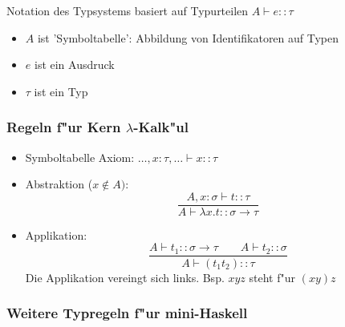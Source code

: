 \documentclass[german,10pt, a4paper, twocolumn]{scrartcl}
\theoremstyle{definition}
\theoremstyle{remark}
\begin{document}
Notation des Typsystems basiert auf Typurteilen $A \vdash e :: \tau$
\begin{itemize}
	\item $A$ ist 'Symboltabelle': Abbildung von Identifikatoren auf Typen
	\item $e$ ist ein Ausdruck
	\item $\tau$ ist ein Typ
\end{itemize}

\subsubsection{Regeln f"ur Kern $\lambda$-Kalk"ul}

\begin{itemize}
	\item Symboltabelle Axiom: $\ldots,x:\tau,\ldots\vdash x ::\tau$
	\item Abstraktion ($x \not\in A)$:
		\begin{displaymath}
			\frac{A,x:\sigma \vdash t :: \tau}{A\vdash \lambda x.t::\sigma \rightarrow \tau}
		\end{displaymath}
	\item Applikation:
		\begin{displaymath}
			\frac{A\vdash t_1 :: \sigma \rightarrow \tau\qquad A \vdash t_2 ::\sigma}{A \vdash (t_1 t_2)::\tau}
		\end{displaymath}
		Die Applikation vereingt sich links. Bsp. $xyz$ steht f"ur $(xy)z$
\end{itemize}

\subsubsection{Weitere Typregeln f"ur mini-Haskell}
\end{document}
